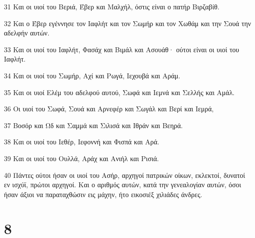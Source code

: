 \par 31 Και οι υιοί του Βεριά, Έβερ και Μαλχήλ, όστις είναι ο πατήρ Βιρζαβίθ.
\par 32 Και ο Έβερ εγέννησε τον Ιαφλήτ και τον Σωμήρ και τον Χωθάμ και την Σουά την αδελφήν αυτών.
\par 33 Και οι υιοί του Ιαφλήτ, Φασάχ και Βιμάλ και Ασουάθ· ούτοι είναι οι υιοί του Ιαφλήτ.
\par 34 Και οι υιοί του Σωμήρ, Αχί και Ρωγά, Ιεχουβά και Αράμ.
\par 35 Και οι υιοί Ελέμ του αδελφού αυτού, Σωφά και Ιεμνά και Σελλής και Αμάλ.
\par 36 Οι υιοί του Σωφά, Σουά και Αρνεφέρ και Σωγάλ και Βερί και Ιεμρά,
\par 37 Βοσόρ και Ωδ και Σαμμά και Σιλισά και Ιθράν και Βεηρά.
\par 38 Και οι υιοί του Ιεθέρ, Ιεφοννή και Φισπά και Αρά.
\par 39 Και οι υιοί του Ουλλά, Αράχ και Ανιήλ και Ρισιά.
\par 40 Πάντες ούτοι ήσαν οι υιοί του Ασήρ, αρχηγοί πατρικών οίκων, εκλεκτοί, δυνατοί εν ισχύϊ, πρώτοι αρχηγοί. Και ο αριθμός αυτών, κατά την γενεαλογίαν αυτών, όσοι ήσαν άξιοι να παραταχθώσιν εις μάχην, ήτο εικοσιέξ χιλιάδες άνδρες.

\chapter{8}


